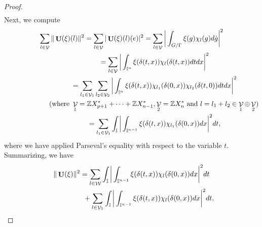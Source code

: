 \documentclass[11pt]{article}
\providecommand{\mathds}[1]{\mathbb{#1}}
\DeclareMathOperator{\U}{\mathbf{U}}
\DeclareMathOperator{\nongen}{\mathcal{V}}
\DeclareMathOperator{\gen}{\mathcal{W}}
\def\tore{{\mathbb I}}
\begin{document}
\begin{proof}
\begin{gather*}
\end{gather*}
Next, we compute
\begin{gather*}
\sum_{l\in
  \nongen}
    \|\U(\xi)(l)\|^2  =
\sum_{l\in \nongen}
    | \U(\xi)(l)(e) |^2  = \sum_{l\in \nongen}\bigg|\int_{G/\Gamma}
    \xi(g) \chi_l(g) d\dot{g} \bigg|^2\\
\hphantom{\sum_{l\in   \nongen}     \|\U(\xi)(l)\|^2}
 = \sum_{l\in \nongen}\bigg|\int_{\tore^{n}}
    \xi(\delta(t, x)) \chi_l(\delta(t, x)
 ) dt dx \bigg|^2\\
\hphantom{\sum_{l\in   \nongen} \|\U(\xi)(l)\|^2}
 = \sum_{l_1\in \nongen_1} \sum_{l_2\in \nongen_2} \bigg|\int_{\tore^{n}}
    \xi(\delta(t, x)) \chi_{l_1}(\delta(0, x))
     \chi_{l_2}(\delta(t, 0) ) dt dx \bigg|^2\\
\hphantom{\sum_{l\in   \nongen} \|\U(\xi)(l)\|^2}
 (\text{where} \ \nongen_1 = \mathds{Z} X_{p+1}^*+\cdots+\mathds{Z}X_{n-1}^*,
     \nongen_2 =\mathds{Z}X_{n}^* \text{ and } l = l_1+l_2
      \in \nongen_1\oplus \nongen_2) \\
\hphantom{\sum_{l\in   \nongen} \|\U(\xi)(l)\|^2}
 = \sum_{l_1\in \nongen_1} \int_{\tore} \bigg|\int_{\tore^{n-1}}
    \xi(\delta(t, x))
 \chi_{l_1}(\delta(0, x))  dx \bigg|^2 dt,
\end{gather*}
where we have applied Parseval's equality with respect to the
variable $t$. Summarizing, we have
\begin{gather*}
  \|\U(\xi)\|^2    =  \sum_{l\in \gen}  \int_{\tore}
 \bigg|
 \int_{\tore^{n-1}} \xi(\delta(t, x))
  \chi_l (\delta(0, x))
 dx  \bigg|^2  dt \\
\hphantom{\|\U(\xi)\|^2    =}{}
+  \sum_{l\in \nongen_1} \int_{\tore}
\bigg|\int_{\tore^{n-1}}
    \xi(\delta(t, x))\chi_{l}(\delta(0, x))
dx \bigg|^2 dt.
\end{gather*}


\end{proof}
\end{document}
